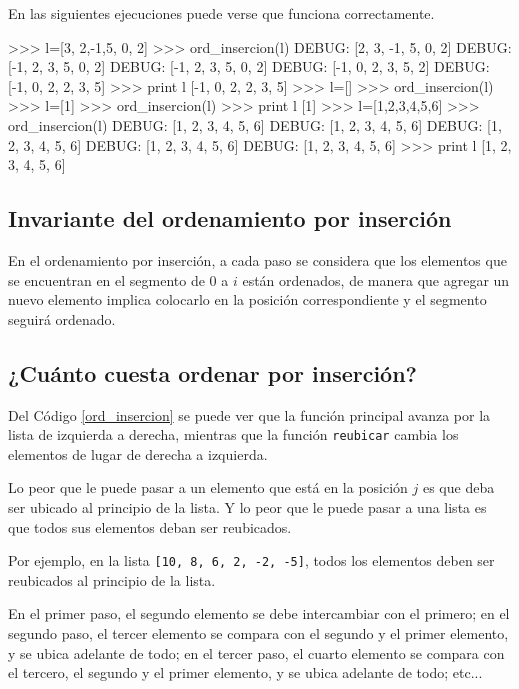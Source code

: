 En las siguientes ejecuciones puede verse que funciona correctamente.

\begin{codigo-python-sn}
>>> l=[3, 2,-1,5, 0, 2]
>>> ord_insercion(l)
DEBUG:  [2, 3, -1, 5, 0, 2]
DEBUG:  [-1, 2, 3, 5, 0, 2]
DEBUG:  [-1, 2, 3, 5, 0, 2]
DEBUG:  [-1, 0, 2, 3, 5, 2]
DEBUG:  [-1, 0, 2, 2, 3, 5]
>>> print l
[-1, 0, 2, 2, 3, 5]
>>> l=[]
>>> ord_insercion(l)
>>> l=[1]
>>> ord_insercion(l)
>>> print l
[1]
>>> l=[1,2,3,4,5,6]
>>> ord_insercion(l)
DEBUG:  [1, 2, 3, 4, 5, 6]
DEBUG:  [1, 2, 3, 4, 5, 6]
DEBUG:  [1, 2, 3, 4, 5, 6]
DEBUG:  [1, 2, 3, 4, 5, 6]
DEBUG:  [1, 2, 3, 4, 5, 6]
>>> print l
[1, 2, 3, 4, 5, 6]
\end{codigo-python-sn}

\subsection{Invariante del ordenamiento por inserción}

En el ordenamiento por inserción, a cada paso se considera que los
elementos que se encuentran en el segmento de $0$ a $i$ están ordenados, de
manera que agregar un nuevo elemento implica colocarlo en la posición
correspondiente y el segmento seguirá ordenado.

\subsection{¿Cuánto cuesta ordenar por inserción?}

Del Código \ref{ord_insercion} se puede ver que la función principal avanza por la
lista de izquierda a derecha, mientras que la función \lstinline!reubicar!
cambia los elementos de lugar de derecha a izquierda.

Lo peor que le puede pasar a un elemento que está en la posición
$j$ es que deba ser ubicado al principio de la lista.  Y lo peor que le
puede pasar a una lista es que todos sus elementos deban ser reubicados.

Por ejemplo, en la lista \lstinline+[10, 8, 6, 2, -2, -5]+, todos los
elementos deben ser reubicados al principio de la lista. 

En el primer paso, el segundo elemento se debe intercambiar con el primero;
en el segundo paso, el tercer elemento se compara con el segundo y el
primer elemento, y se ubica adelante de todo; en el tercer paso, el cuarto
elemento se compara con el tercero, el segundo y el primer elemento, y se
ubica adelante de todo; etc...

